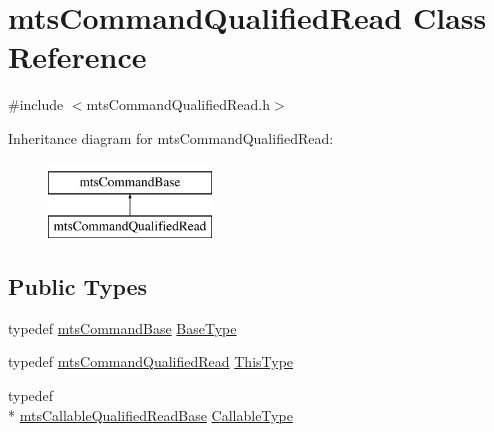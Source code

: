 \hypertarget{classmts_command_qualified_read}{\section{mts\-Command\-Qualified\-Read Class Reference}
\label{classmts_command_qualified_read}
}


{\ttfamily \#include $<$mts\-Command\-Qualified\-Read.\-h$>$}

Inheritance diagram for mts\-Command\-Qualified\-Read\-:\begin{figure}[H]
\begin{center}
\leavevmode
\includegraphics[height=2.000000cm]{df/df8/classmts_command_qualified_read}
\end{center}
\end{figure}
\subsection*{Public Types}
\begin{DoxyCompactItemize}
\item 
typedef \hyperlink{classmts_command_base}{mts\-Command\-Base} \hyperlink{classmts_command_qualified_read_a594530e3533708ab5f6535c5ccf6addd}{Base\-Type}
\item 
typedef \hyperlink{classmts_command_qualified_read}{mts\-Command\-Qualified\-Read} \hyperlink{classmts_command_qualified_read_a360793a513215088a297832b6066f368}{This\-Type}
\item 
typedef \\*
\hyperlink{classmts_callable_qualified_read_base}{mts\-Callable\-Qualified\-Read\-Base} \hyperlink{classmts_command_qualified_read_a95ca582ba302ac597fb9106a8270cce5}{Callable\-Type}
\end{DoxyCompactItemize}
